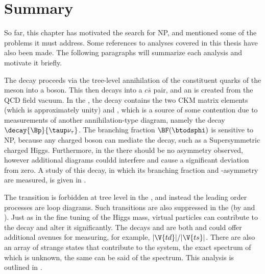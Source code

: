 \section{Summary}

So far, this chapter has motivated the search for NP, and mentioned some of the problems it must
address.
Some references to analyses covered in this thesis have also been made.
The following paragraphs will summarize each analysis and motivate it briefly.

        The decay \btodsphi proceeds via the tree-level annihilation of the constituent quarks of
        the \Bp meson into a \Wp boson.
        This then decays into a $c\bar s$ pair, and an \ssbar is created from the QCD field vacuum.
        In the \sm, the decay contains the two CKM matrix elements  (which is approximately
        unity) and
        , which is a source of some contention due to measurements of another
        annihilation-type diagram, namely the decay $\decay{\Bp}{\taup\nu_\tau}$.
        The branching fraction $\BF(\btodsphi)$ is sensitive to NP, because any charged boson can
        mediate
        the decay, such as a Supersymmetric charged Higgs.
        Furthermore, in the \sm there should be no \CP asymmetry observed, however additional
        diagrams couldd
        interfere and cause a significant deviation from zero.
        A study of this decay, in which its branching fraction and \CP-asymmetry are measured, is
        given in
        .

        The \fcnc transition  is forbidden at tree level in the \sm, and instead
        the leading order processes are loop diagrams.
        Such transitions are also \ckm suppressed in the \sm (by  and ).
        Just as in the fine tuning of the Higgs mass, virtual \bsm particles can contribute to the
        decay and
        alter it significantly.
        The decays \btokpipimumu and \btophikmumu are both   and could offer
        additional avenues for measuring, for example, $|\V{td}|/|\V{ts}|$.
        There are also an array of strange states that contribute to the \kpipi system, the exact
        spectrum of which is unknown, the same can be said of the \phik spectrum.
        This analysis is outlined in .

